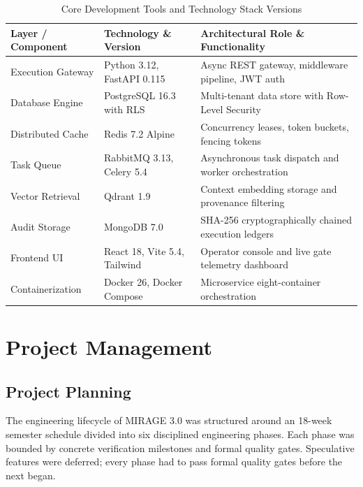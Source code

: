 \documentclass[12pt,a4paper]{report}
\numberwithin{equation}{section}
\begin{document}
\begin{table}[h!]
\centering
\caption{Core Development Tools and Technology Stack Versions}
\vspace{4pt}
\begin{tabularx}{\textwidth}{l p{4.2cm} X}
\toprule
\textbf{Layer / Component} & \textbf{Technology \& Version} & \textbf{Architectural Role \& Functionality} \\
\midrule
Execution Gateway & Python 3.12, FastAPI 0.115 & Async REST gateway, middleware pipeline, JWT auth \\
Database Engine & PostgreSQL 16.3 with RLS & Multi-tenant data store with Row-Level Security \\
Distributed Cache & Redis 7.2 Alpine & Concurrency leases, token buckets, fencing tokens \\
Task Queue & RabbitMQ 3.13, Celery 5.4 & Asynchronous task dispatch and worker orchestration \\
Vector Retrieval & Qdrant 1.9 & Context embedding storage and provenance filtering \\
Audit Storage & MongoDB 7.0 & SHA-256 cryptographically chained execution ledgers \\
Frontend UI & React 18, Vite 5.4, Tailwind & Operator console and live gate telemetry dashboard \\
Containerization & Docker 26, Docker Compose & Microservice eight-container orchestration \\
\bottomrule
\end{tabularx}
\end{table}

\chapter{Project Management}

\section{Project Planning}
The engineering lifecycle of MIRAGE 3.0 was structured around an 18-week semester schedule divided into six disciplined engineering phases. Each phase was bounded by concrete verification milestones and formal quality gates. Speculative features were deferred; every phase had to pass formal quality gates before the next began.
\end{document}

